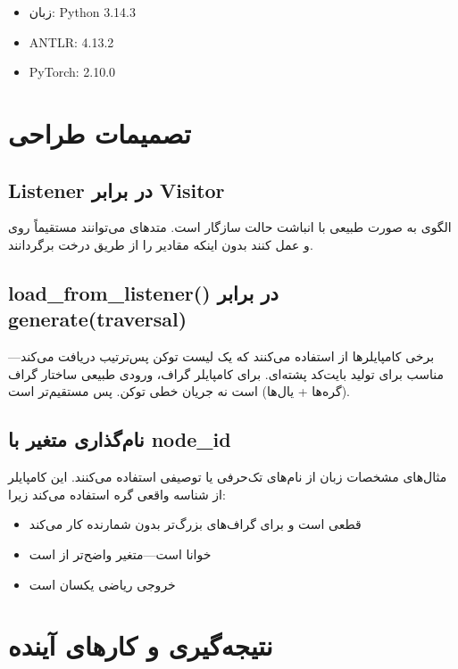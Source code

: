 \documentclass{nngraph-fa}
\begin{document}
\begin{itemize}[noitemsep]
    \item زبان: Python 3.14.3
    \item ANTLR: 4.13.2
    \item PyTorch: 2.10.0
\end{itemize}

\chapter{تصمیمات طراحی}

\section{Listener در برابر Visitor}

الگوی  به صورت طبیعی با انباشت حالت سازگار است.
متدهای  می‌توانند مستقیماً روی  و
 عمل کنند بدون اینکه مقادیر را از طریق درخت
برگردانند.

\section{load\_from\_listener() در برابر generate(traversal)}

برخی کامپایلرها از  استفاده
می‌کنند که یک لیست توکن پس‌ترتیب دریافت می‌کند---مناسب برای تولید
بایت‌کد پشته‌ای. برای کامپایلر گراف، ورودی طبیعی ساختار گراف
(گره‌ها + یال‌ها) است نه جریان خطی توکن. پس
 مستقیم‌تر است.

\section{نام‌گذاری متغیر با node\_id}

مثال‌های مشخصات زبان از نام‌های تک‌حرفی یا توصیفی استفاده
می‌کنند. این کامپایلر از شناسه واقعی گره استفاده می‌کند زیرا:
\begin{itemize}[noitemsep]
    \item قطعی است و برای گراف‌های بزرگ‌تر بدون شمارنده کار می‌کند
    \item خوانا است---متغیر  واضح‌تر از  است
    \item خروجی ریاضی یکسان است
\end{itemize}

\chapter{نتیجه‌گیری و کارهای آینده}
\end{document}
